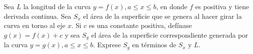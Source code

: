\item Sea $L$ la longitud de la curva $y = f(x), a \le x \le b$, en donde $f$ es positiva y tiene derivada continua. Sea $S_x$ el área de la superficie que se genera al hacer girar la curva en torno al eje $x$. Si $c$ es una constante positiva, defínase $g(x) = f(x) + c$ y sea $S_g$ el área de la superficie correspondiente generada por la curva $y = g(x), a \le x \le b$. Exprese $S_g$ en términos de $S_x$ y $L$.
